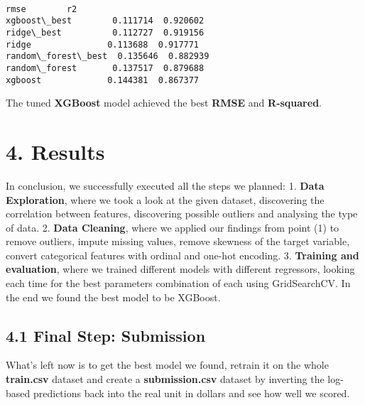 \documentclass[11pt]{article}
\makeatletter
\newcommand{\boxspacing}{\kern\kvtcb@left@rule\kern\kvtcb@boxsep}
\newcommand{\prompt}[4]{
        {\ttfamily\llap{{\color{#2}[#3]:\hspace{3pt}#4}}\vspace{-\baselineskip}}
    }
\makeatother
\begin{document}
    \begin{center}
    \end{center}
    { \hspace*{\fill} \\}
    
            \begin{tcolorbox}[breakable, size=fbox, boxrule=.5pt, pad at break*=1mm, opacityfill=0]
\prompt{Out}{outcolor}{34}{\boxspacing}
\begin{Verbatim}[commandchars=\\\{\}]
                        rmse        r2
xgboost\_best        0.111714  0.920602
ridge\_best          0.112727  0.919156
ridge               0.113688  0.917771
random\_forest\_best  0.135646  0.882939
random\_forest       0.137517  0.879688
xgboost             0.144381  0.867377
\end{Verbatim}
\end{tcolorbox}
        
    The tuned \textbf{XGBoost} model achieved the best \textbf{RMSE} and
\textbf{R-squared}.

    \section{4. Results}\label{results}

    In conclusion, we successfully executed all the steps we planned: 1.
\textbf{Data Exploration}, where we took a look at the given dataset,
discovering the correlation between features, discovering possible
outliers and analysing the type of data. 2. \textbf{Data Cleaning},
where we applied our findings from point (1) to remove outliers, impute
missing values, remove skewness of the target variable, convert
categorical features with ordinal and one-hot encoding. 3.
\textbf{Training and evaluation}, where we trained different models with
different regressors, looking each time for the best parameters
combination of each using GridSearchCV. In the end we found the best
model to be XGBoost.

    \subsection{4.1 Final Step: Submission}\label{final-step-submission}

What's left now is to get the best model we found, retrain it on the
whole \textbf{train.csv} dataset and create a \textbf{submission.csv}
dataset by inverting the log-based predictions back into the real unit
in dollars and see how well we scored.
\end{document}
